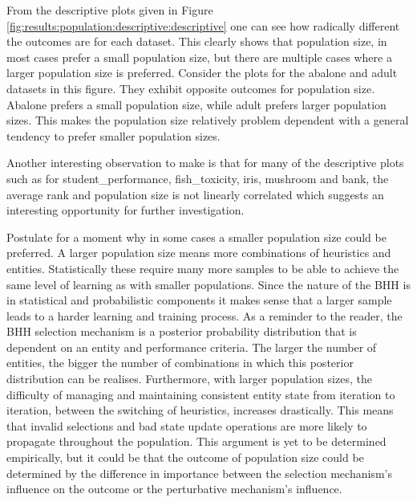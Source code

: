 From the descriptive plots given in Figure \ref{fig:results:population:descriptive:descriptive} one can see how radically different the outcomes are for each dataset. This clearly shows that population size, in most cases prefer a small population size, but there are multiple cases where a larger population size is preferred. Consider the plots for the abalone and adult datasets in this figure. They exhibit opposite outcomes for population size. Abalone prefers a small population size, while adult prefers larger population sizes. This makes the population size relatively problem dependent with a general tendency to prefer smaller population sizes.

Another interesting observation to make is that for many of the descriptive plots such as for student\_performance, fish\_toxicity, iris, mushroom and bank, the average rank and population size is not linearly correlated which suggests an interesting opportunity for further investigation.

Postulate for a moment why in some cases a smaller population size could be preferred. A larger population size means more combinations of heuristics and entities. Statistically these require many more samples to be able to achieve the same level of learning as with smaller populations. Since the nature of the \Ac{BHH} is in statistical and probabilistic components it makes sense that a larger sample leads to a harder learning and training process. As a reminder to the reader, the \ac{BHH} selection mechanism is a posterior probability distribution that is dependent on an entity and performance criteria. The larger the number of entities, the bigger the number of combinations in which this posterior distribution can be realises. Furthermore, with larger population sizes, the difficulty of managing and maintaining consistent entity state from iteration to iteration, between the switching of heuristics, increases drastically. This means that invalid selections and bad state update operations are more likely to propagate throughout the population. This argument is yet to be determined empirically, but it could be that the outcome of population size could be determined by the difference in importance between the selection mechanism's influence on the outcome or the perturbative mechanism's influence.


